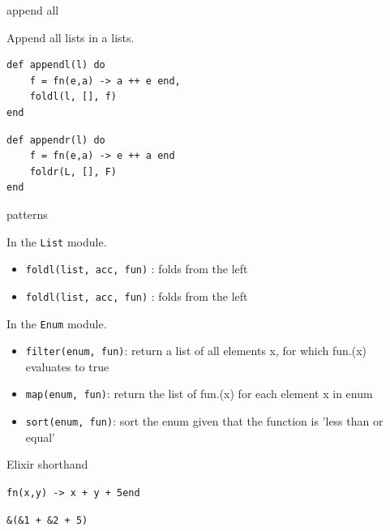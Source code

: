 \begin{frame}[fragile]{append all}

\pause Append all lists in a lists.

\vspace{20pt}

\begin{verbatim}
def appendl(l) do
    f = fn(e,a) -> a ++ e end,
    foldl(l, [], f)
end
\end{verbatim}

\begin{verbatim}
def appendr(l) do
    f = fn(e,a) -> e ++ a end
    foldr(L, [], F)
end
\end{verbatim}

\end{frame}



\begin{frame}{patterns}

In the {\tt List} module. 

\begin{itemize}
\item {\tt foldl(list, acc, fun)} : folds from the left 
\item {\tt foldl(list, acc, fun)} : folds from the left
\end{itemize}

\pause

In the {\tt Enum} module. 

\begin{itemize}
\item {\tt filter(enum, fun)}: return a list of all elements x, for which fun.(x) evaluates to true
\item {\tt map(enum, fun)}: return the list of fun.(x) for each element x in enum
\item {\tt sort(enum, fun)}: sort the enum given that the function is 'less than or equal'
\end{itemize}

\end{frame}

\begin{frame}[fragile]{Elixir shorthand}

\hspace{40pt}  {\tt fn(x,y) -> x + y + 5end}

\vspace{40pt}  \pause

\hspace{40pt}  {\tt \&(\&1 + \&2 + 5)}

\end{frame}


